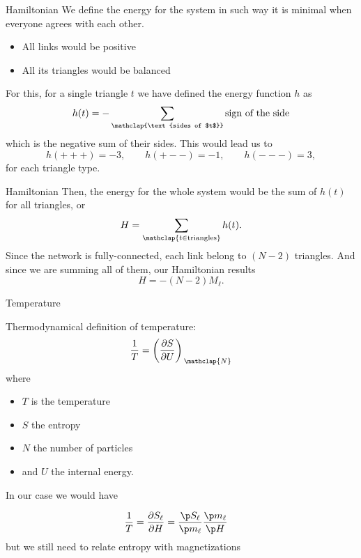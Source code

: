 
	
\begin{frame}{Hamiltonian}
	We define the energy for the system in such way it is minimal when everyone agrees with each other. 
\begin{itemize}
	\item All links would be positive
	\item All its triangles would be balanced 
\end{itemize}

For this, for a single triangle $t$ we have defined the energy function $h$ as
\begin{equation}
    h(t) = - \sum_{\mathclap{\text{sides of $t$}}} \text{sign of the side} 
\end{equation}
which is the negative sum of their sides. This would lead us to
\begin{equation}
        h(+++) = -3,\qquad
		h(+--) = -1,\qquad
		h(---) = 3,
    \label{eq:h_types}
\end{equation}
for each triangle type.\\[1em]
\end{frame}

\begin{frame}{Hamiltonian}
 Then, the energy for the whole system would be the sum of $h(t)$ for all triangles, or
 \begin{equation}
	H =	\sum_{\mathclap{t\in\text{triangles}}} h(t).
 \end{equation}
Since the network is fully-connected, each link belong to $(N-2)$ triangles. And since we are summing all of them, our Hamiltonian results 
\begin{equation}
	H = -(N-2)M_\ell.\label{eq:H_M}
\end{equation}
\end{frame}


\begin{frame}{Temperature}

Thermodynamical definition of temperature:
\begin{equation}
    \frac{1}{T} = \left( \frac{\partial S}{\partial U} \right)_{\,\mathclap{N}} \label{eq:T_def}
\end{equation}
where 
\begin{itemize}
	\item  $T$ is the temperature
	\item $S$ the entropy
	\item $N$ the number of particles
	\item and $U$ the internal energy.
\end{itemize}
In our case we would have

\begin{align}
    \frac{1}{T} &=  \frac{\partial S_\ell}{\partial H}  = \frac{\p S_\ell}{\p m_\ell} \frac{\p m_\ell}{\p H}
\end{align}
but we still need to relate entropy with magnetizations
\end{frame}

